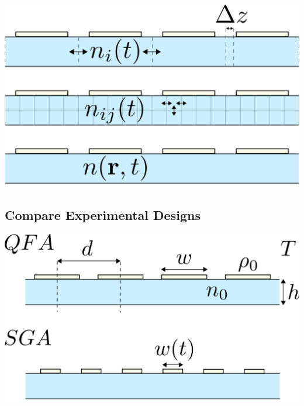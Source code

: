 \begin{Figure}
  \centering
  \includegraphics[width=\linewidth]{height_dep_miniqfa_delta_z}
\end{Figure}
\subsection{Compare Experimental Designs}
\label{sec:comp-exper-designs}


\begin{Figure}
  \centering
  \includegraphics[width=\linewidth]{qfa_v_sga_vars}
\end{Figure}






